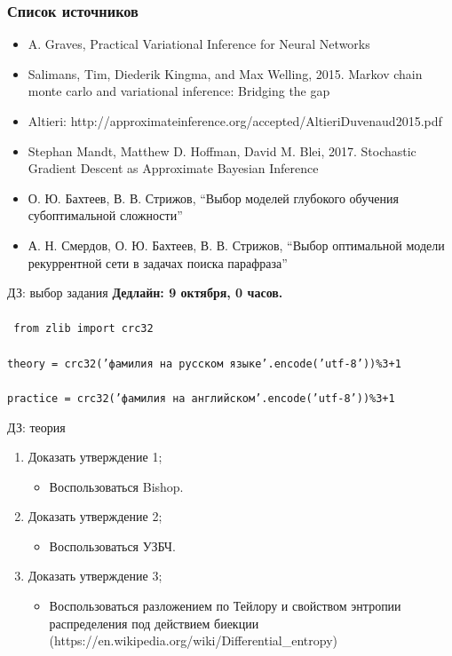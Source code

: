 \documentclass[usenames,dvipsnames,10pt,pdf,utf8,russian,aspectratio=43]{beamer}
\begin{document}
\begin{frame}
\frametitle{Список источников}
\begin{itemize}
\item A. Graves, Practical Variational Inference for Neural Networks
\item Salimans, Tim, Diederik Kingma, and Max Welling, 2015. Markov chain monte carlo and variational inference: Bridging the gap
\item Altieri: http://approximateinference.org/accepted/AltieriDuvenaud2015.pdf
\item Stephan Mandt, Matthew D. Hoffman, David M. Blei, 2017. Stochastic Gradient Descent as Approximate Bayesian Inference
\item О. Ю. Бахтеев, В. В. Стрижов, “Выбор моделей глубокого обучения субоптимальной сложности”
\item А. Н. Смердов, О. Ю. Бахтеев, В. В. Стрижов, “Выбор оптимальной модели рекуррентной сети в задачах поиска парафраза”
\end{itemize}
\end{frame}

\begin{frame}{ДЗ: выбор задания}
\textbf{Дедлайн: 9 октября, 0 часов.}\\~\\

\texttt{ from zlib import crc32}\\~\\
\texttt{theory = crc32('фамилия на русском языке'.encode('utf-8'))\%3+1}\\~\\
\texttt{practice = crc32('фамилия на английском'.encode('utf-8'))\%3+1}
\end{frame}

\begin{frame}{ДЗ: теория}
\begin{enumerate}
\item Доказать утверждение 1;
\begin{itemize}
\item Воспользоваться Bishop.
\end{itemize}

\item Доказать утверждение 2;
\begin{itemize}
\item Воспользоваться УЗБЧ.
\end{itemize}

\item Доказать утверждение 3;
\begin{itemize}
\item Воспользоваться разложением по Тейлору и свойством энтропии распределения под действием биекции (https://en.wikipedia.org/wiki/Differential\_entropy)
\end{itemize}
\end{enumerate}
\end{frame}
\end{document}
